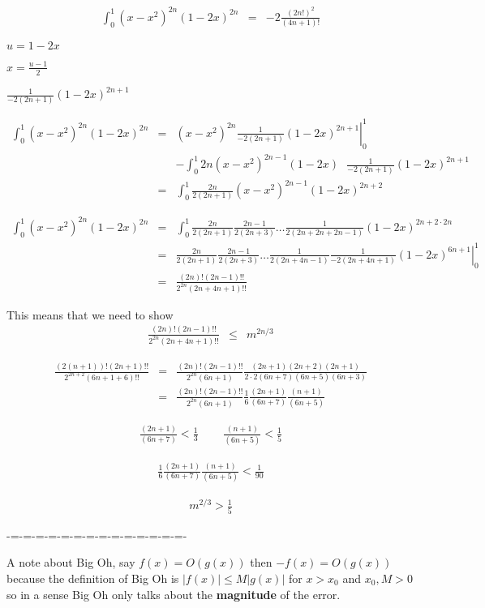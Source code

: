 \documentclass[aps,preprint,preprintnumbers,nofootinbib,showpacs,prd]{revtex4-1}
\newcommand{\nbea}{\begin{eqnarray*}}
\newcommand{\neea}{\end{eqnarray*}}
\begin{document}
%
\nbea
\int_0^1 (x - x^2)^{2n} (1-2x)^{2n} & = & -2\frac{(2n!)^2}{(4n+1)!} 
\neea
%

$u = 1-2x$

$x = \frac{u-1}{2}$

$\frac{1}{-2(2n+1)} (1-2x)^{2n+1}$

%
\nbea
\int_0^1 (x - x^2)^{2n} (1-2x)^{2n} & = & \left. (x-x^2)^{2n}\frac{1}{-2(2n+1)} (1-2x)^{2n+1}\right |_0^1 \\
&& - \int_0^1 2n (x - x^2)^{2n-1} (1 - 2x) ~~~ \frac{1}{-2(2n+1)} (1 - 2x)^{2n+1} \\
& = & \int_0^1 \frac{2n}{2(2n+1)} (x - x^2)^{2n-1} (1 - 2x)^{2n+2}
\neea
%

%
\nbea
\int_0^1 (x - x^2)^{2n} (1-2x)^{2n} & = & \int_0^1 \frac{2n}{2(2n+1)} \frac{2n-1}{2(2n+3)} \dots \frac{1}{2(2n + 2n + 2n - 1)} (1 - 2x)^{2n + 2\cdot2n} \\
& = & \left. \frac{2n}{2(2n+1)} \frac{2n-1}{2(2n+3)} \dots \frac{1}{2(2n + 4n - 1)} \frac{1}{-2(2n + 4n + 1)} (1-2x)^{6n+1}\right|_0^1 \\
& = & \frac{(2n)!(2n-1)!!}{2^{2n} (2n + 4n + 1)!!}
\neea
%

This means that we need to show 
%
\nbea
\frac{(2n)!(2n-1)!!}{2^{2n} (2n + 4n + 1)!!} & \le & m^{2n/3}
\neea
%

%
\nbea
\frac{(2(n+1))!(2n + 1)!!}{2^{2n+2} (6n + 1 + 6)!!} & = & \frac{(2n)!(2n-1)!!}{2^{2n}(6n + 1)} \frac{(2n+1)(2n+2)(2n+1)}{2\cdot2 (6n + 7) (6n + 5) (6n + 3)} \\
& = & \frac{(2n)!(2n-1)!!}{2^{2n}(6n + 1)} \frac{1}{6}\frac{(2n+1)}{(6n + 7)} \frac{(n+1)}{(6n + 5)}
\neea
%

%
\nbea
\frac{(2n+1)}{(6n + 7)} < \frac{1}{3} ~~~~~ ~~~~~ \frac{(n+1)}{(6n + 5)} < \frac{1}{5}
\neea
%

%
\nbea
\frac{1}{6}\frac{(2n+1)}{(6n + 7)} \frac{(n+1)}{(6n + 5)} < \frac{1}{90}
\neea
%

%
\nbea
m^{2/3} > \frac{1}{5}
\neea
%













-=-=-=-=-=-=-=-=-=-=-=-=-=-=-


A note about Big Oh, say $f(x) = O(g(x))$ then $-f(x) = O(g(x))$ because the definition of Big Oh is $|f(x)| \le M|g(x)|$ for $x > x_0$ and $x_0, M > 0$ so in a sense Big Oh only talks about the {\bf magnitude} of the error.
\end{document}
